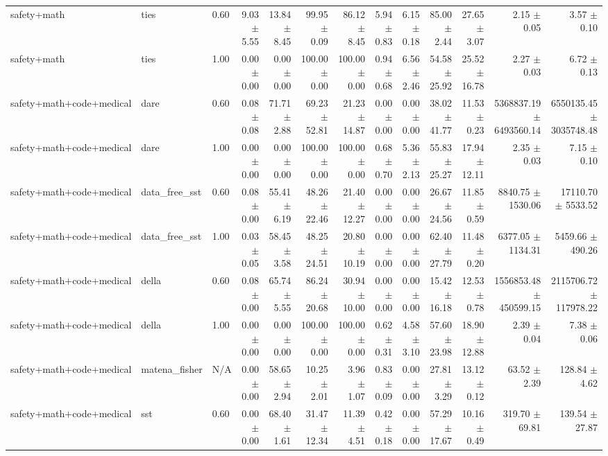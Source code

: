\documentclass{article}
\begin{document}
{\begin{tabular}{lllrrrrrrrrrr}
safety+math & ties & 0.60 & 9.03 $\pm$ 5.55 & 13.84 $\pm$ 8.45 & 99.95 $\pm$ 0.09 & 86.12 $\pm$ 8.45 & 5.94 $\pm$ 0.83 & 6.15 $\pm$ 0.18 & 85.00 $\pm$ 2.44 & 27.65 $\pm$ 3.07 & 2.15 $\pm$ 0.05 & 3.57 $\pm$ 0.10 \\
safety+math & ties & 1.00 & 0.00 $\pm$ 0.00 & 0.00 $\pm$ 0.00 & 100.00 $\pm$ 0.00 & 100.00 $\pm$ 0.00 & 0.94 $\pm$ 0.68 & 6.56 $\pm$ 2.46 & 54.58 $\pm$ 25.92 & 25.52 $\pm$ 16.78 & 2.27 $\pm$ 0.03 & 6.72 $\pm$ 0.13 \\
safety+math+code+medical & dare & 0.60 & 0.08 $\pm$ 0.08 & 71.71 $\pm$ 2.88 & 69.23 $\pm$ 52.81 & 21.23 $\pm$ 14.87 & 0.00 $\pm$ 0.00 & 0.00 $\pm$ 0.00 & 38.02 $\pm$ 41.77 & 11.53 $\pm$ 0.23 & 5368837.19 $\pm$ 6493560.14 & 6550135.45 $\pm$ 3035748.48 \\
safety+math+code+medical & dare & 1.00 & 0.00 $\pm$ 0.00 & 0.00 $\pm$ 0.00 & 100.00 $\pm$ 0.00 & 100.00 $\pm$ 0.00 & 0.68 $\pm$ 0.70 & 5.36 $\pm$ 2.13 & 55.83 $\pm$ 25.27 & 17.94 $\pm$ 12.11 & 2.35 $\pm$ 0.03 & 7.15 $\pm$ 0.10 \\
safety+math+code+medical & data\_free\_sst & 0.60 & 0.08 $\pm$ 0.00 & 55.41 $\pm$ 6.19 & 48.26 $\pm$ 22.46 & 21.40 $\pm$ 12.27 & 0.00 $\pm$ 0.00 & 0.00 $\pm$ 0.00 & 26.67 $\pm$ 24.56 & 11.85 $\pm$ 0.59 & 8840.75 $\pm$ 1530.06 & 17110.70 $\pm$ 5533.52 \\
safety+math+code+medical & data\_free\_sst & 1.00 & 0.03 $\pm$ 0.05 & 58.45 $\pm$ 3.58 & 48.25 $\pm$ 24.51 & 20.80 $\pm$ 10.19 & 0.00 $\pm$ 0.00 & 0.00 $\pm$ 0.00 & 62.40 $\pm$ 27.79 & 11.48 $\pm$ 0.20 & 6377.05 $\pm$ 1134.31 & 5459.66 $\pm$ 490.26 \\
safety+math+code+medical & della & 0.60 & 0.08 $\pm$ 0.00 & 65.74 $\pm$ 5.55 & 86.24 $\pm$ 20.68 & 30.94 $\pm$ 10.00 & 0.00 $\pm$ 0.00 & 0.00 $\pm$ 0.00 & 15.42 $\pm$ 16.18 & 12.53 $\pm$ 0.78 & 1556853.48 $\pm$ 450599.15 & 2115706.72 $\pm$ 117978.22 \\
safety+math+code+medical & della & 1.00 & 0.00 $\pm$ 0.00 & 0.00 $\pm$ 0.00 & 100.00 $\pm$ 0.00 & 100.00 $\pm$ 0.00 & 0.62 $\pm$ 0.31 & 4.58 $\pm$ 3.10 & 57.60 $\pm$ 23.98 & 18.90 $\pm$ 12.88 & 2.39 $\pm$ 0.04 & 7.38 $\pm$ 0.06 \\
safety+math+code+medical & matena\_fisher & N/A & 0.00 $\pm$ 0.00 & 58.65 $\pm$ 2.94 & 10.25 $\pm$ 2.01 & 3.96 $\pm$ 1.07 & 0.83 $\pm$ 0.09 & 0.00 $\pm$ 0.00 & 27.81 $\pm$ 3.29 & 13.12 $\pm$ 0.12 & 63.52 $\pm$ 2.39 & 128.84 $\pm$ 4.62 \\
safety+math+code+medical & sst & 0.60 & 0.00 $\pm$ 0.00 & 68.40 $\pm$ 1.61 & 31.47 $\pm$ 12.34 & 11.39 $\pm$ 4.51 & 0.42 $\pm$ 0.18 & 0.00 $\pm$ 0.00 & 57.29 $\pm$ 17.67 & 10.16 $\pm$ 0.49 & 319.70 $\pm$ 69.81 & 139.54 $\pm$ 27.87 \\

\end{tabular}}
\end{document}
